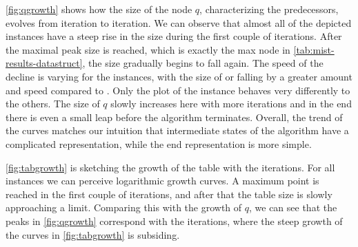 \autoref{fig:qgrowth} shows how the size of the node $q$, characterizing the predecessors, evolves from iteration to iteration. 
We can observe that almost all of the depicted instances have a steep rise in the size during the first couple of iterations. After the maximal peak size is reached, which is exactly the max node in \autoref{tab:mist-results-datastruct}, the size gradually begins to fall again. The speed of the decline is varying for the instances, with the size of  or  falling by a greater amount and speed compared to .
Only the plot of the  instance behaves very differently to the others. The size of $q$ slowly increases here with more iterations and in the end there is even a small leap before the algorithm terminates. Overall, the trend of the curves matches our intuition that intermediate states of the algorithm have a complicated representation, while the end representation is more simple.

\autoref{fig:tabgrowth} is sketching the growth of the table with the iterations. For all instances we can perceive logarithmic growth curves. A maximum point is reached in the first couple of iterations, and after that the table size is slowly approaching a limit. Comparing this with the growth of $q$, we can see that the peaks in \autoref{fig:qgrowth} correspond with the iterations, where the steep growth of the curves in \autoref{fig:tabgrowth} is subsiding.








%

